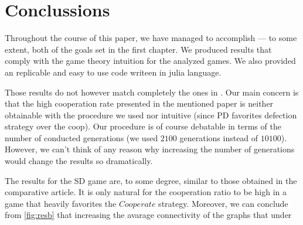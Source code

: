 \documentclass[english, twoside, 12pt, a4paper]{article}
\theoremstyle{definition}
\theoremstyle{plain}
\theoremstyle{remark}
\begin{document}
\clearpage
\section{Conclussions}

Throughout the course of this paper, we have managed to accomplish --- to some extent, both of the goals set in the first chapter. We produced results that comply with the game theory intuition for the analyzed games. We also provided an replicable and easy to use code writeen in julia language. 

Those results do not however match completely the ones in \cite{santos2005scale}. Our main concern is that the high cooperation rate presented in the mentioned paper is neither obtainable with the procedure we used nor intuitive (since PD favorites defection strategy over the coop). Our procedure is of course debatable in terms of the number of conducted generations (we used $2 100$ generations instead of $10 100$). However, we can't think of any reason why increasing the number of generations would change the results so dramatically. 

The results for the SD game are, to some degree, similar to those obtained in the comparative article. It is only natural for the cooperation ratio to be high in a game that heavily favorites the $Cooperate$ strategy. Moreover, we can conclude from \ref{fig:resb} that increasing the avarage connectivity of the graphs that under 
\end{document}
